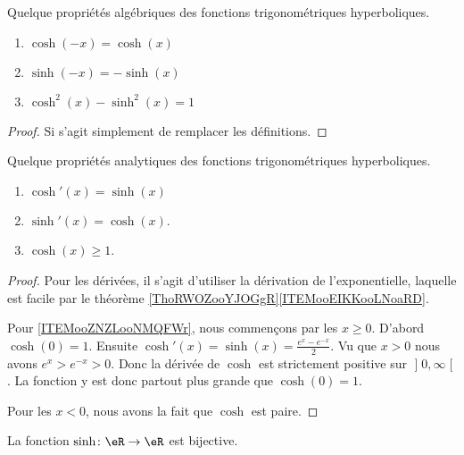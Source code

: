 \begin{proposition}
    Quelque propriétés algébriques des fonctions trigonométriques hyperboliques.
    \begin{enumerate}
        \item
            \( \cosh(-x)=\cosh(x)\)
        \item
            \( \sinh(-x)=-\sinh(x)\)
        \item
            \( \cosh^2(x)-\sinh^2(x)=1\)
    \end{enumerate}
\end{proposition}

\begin{proof}
    Si s'agit simplement de remplacer les définitions.
\end{proof}

\begin{proposition}     \label{PROPooAOOHooXvLfrZ}
    Quelque propriétés analytiques des fonctions trigonométriques hyperboliques.
    \begin{enumerate}
        \item
            \( \cosh'(x)=\sinh(x)\)
        \item
            \( \sinh'(x)=\cosh(x)\).
        \item       \label{ITEMooZNZLooNMQFWr}
            \( \cosh(x)\geq 1\).
    \end{enumerate}
\end{proposition}

\begin{proof}
    Pour les dérivées, il s'agit d'utiliser la dérivation de l'exponentielle, laquelle est facile par le théorème \ref{ThoRWOZooYJOGgR}\ref{ITEMooEIKKooLNoaRD}.

    Pour \ref{ITEMooZNZLooNMQFWr}, nous commençons par les \( x\geq 0\). D'abord $\cosh(0)=1$. Ensuite \( \cosh'(x)=\sinh(x)=\frac{  e^{x}- e^{-x} }{ 2 }\). Vu que \( x> 0\) nous avons \(  e^{x}> e^{-x}>0\). Donc la dérivée de \( \cosh\) est strictement positive sur \( \mathopen] 0 , \infty \mathclose[\). La fonction y est donc partout plus grande que \( \cosh(0)=1\).

    Pour les \( x<0\), nous avons la fait que \( \cosh\) est paire.
\end{proof}

\begin{proposition}     \label{PROPooQLNYooIIOdvm}
    La fonction \( \sinh\colon \eR\to \eR\) est bijective.
\end{proposition}

